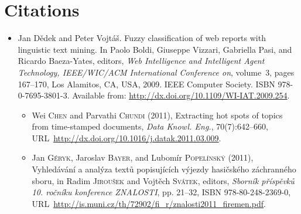 \documentclass[12pt,a4paper,oneside,notitlepage]{article}
\newcommand{\urlprefix}{URL~}
\begin{document}
\section*{Citations}



\begin{itemize}

\item
Jan D{\v{e}}dek and Peter Vojt{\'{a}}{\v{s}}.
\newblock Fuzzy classification of web reports with linguistic text mining.
\newblock In Paolo Boldi, Giuseppe Vizzari, Gabriella Pasi, and Ricardo
  Baeza-Yates, editors, {\em Web Intelligence and Intelligent Agent Technology,
  IEEE/WIC/ACM International Conference on}, volume~3, pages 167--170, Los
  Alamitos, CA, USA, 2009. IEEE Computer Society.
\newblock ISBN 978-0-7695-3801-3.
\newblock Available from: \url{http://dx.doi.org/10.1109/WI-IAT.2009.254}.

\begin{itemize}
\item
Wei \textsc{Chen} and Parvathi \textsc{Chundi} (2011), Extracting hot spots of
  topics from time-stamped documents, \emph{Data Knowl. Eng.}, 70(7):642--660,
  \urlprefix\url{http://dx.doi.org/10.1016/j.datak.2011.03.009}.
	
\item
Jan \textsc{G{\'e}ryk}, Jaroslav \textsc{Bayer}, and Lubom{\'i}r
  \textsc{Popel{\'i}nsk{\'y}} (2011), Vyhled{\'a}v{\'a}n{\'i} a anal{\'y}za
  text{\r{u}} popisuj{\'i}c{\'i}ch v{\'y}jezdy hasi{\v{c}}sk{\'e}ho
  z{\'a}chrann{\'e}ho sboru, in Radim \textsc{Jirou{\v{s}}ek} and Vojt{\v{e}}ch
  \textsc{Sv{\'a}tek}, editors, \emph{Sborn{\'i}k
  p{\v{r}}{\'i}sp{\v{e}}vk{\r{u}} 10. ro{\v{c}}n{\'i}ku konference ZNALOSTI},
  pp. 21--32, ISBN 978-80-248-2369-0,
  \urlprefix\url{http://is.muni.cz/th/72902/fi_r/znalosti2011_firemen.pdf}.	
	
%
\end{itemize}



\end{itemize}
\end{document}
